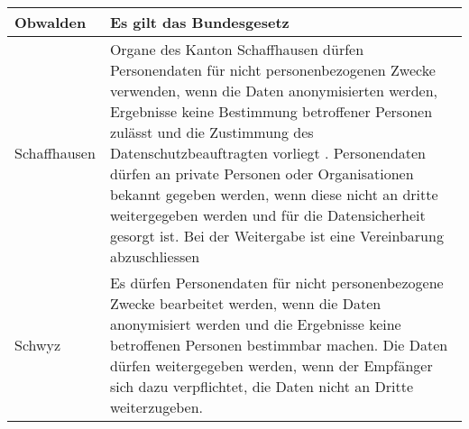 \begin{longtable}{| p{} | p{}|}
		\hline
		Obwalden & Es gilt das Bundesgesetz \parencite{DSSGOW} \\
		\hline
		Schaffhausen & Organe des Kanton Schaffhausen dürfen Personendaten für nicht personenbezogenen Zwecke verwenden, wenn die Daten anonymisierten werden, Ergebnisse keine Bestimmung betroffener Personen zulässt und die Zustimmung des Datenschutzbeauftragten vorliegt \parencite[§§ 12 Abs. 1]{DSSGSH}. Personendaten dürfen an private Personen oder Organisationen bekannt gegeben werden, wenn diese nicht an dritte weitergegeben werden und für die Datensicherheit gesorgt ist. Bei der Weitergabe ist eine Vereinbarung abzuschliessen \parencite[§§ 12 Abs 2]{DSSGSH} \\
		\hline
    Schwyz & Es dürfen Personendaten für nicht personenbezogene Zwecke bearbeitet werden, wenn die Daten anonymisiert werden und die Ergebnisse keine betroffenen Personen bestimmbar machen. Die Daten dürfen weitergegeben werden, wenn der Empfänger sich dazu verpflichtet, die Daten nicht an Dritte weiterzugeben. \parencite[§§ 14 Abs 1-2]{DSSGSZ} \\


\end{longtable}
